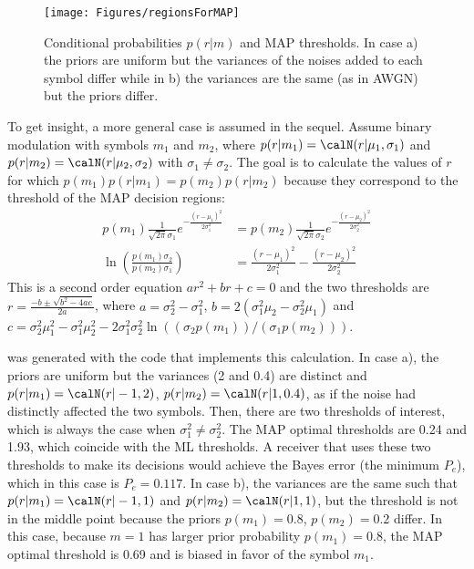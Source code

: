 \begin{figure}[htbp]
\centering
\texttt{[image: Figures/regionsForMAP]}
\caption{Conditional probabilities $p(r|m)$ and MAP thresholds. In case a) the priors are uniform but the variances of the noises added to each symbol differ while in b) the variances are the same (as in AWGN) but the priors differ.\label{fig:regionsForMAP}}
\end{figure}

To get insight, a more general case is assumed in the sequel. Assume binary modulation with symbols $m_1$ and $m_2$, where $p(r|m_1)=\calN(r|\mu_1,\sigma_1)$ and $p(r|m_2)=\calN(r|\mu_2,\sigma_2)$ with $\sigma_1 \ne \sigma_2$. The goal is to calculate the values of $r$ for which $p(m_1)p(r|m_1)=p(m_2)p(r|m_2)$ because they correspond to the threshold of the MAP decision regions:
\begin{align*}
p(m_1) \frac{1}{\sqrt{2 \pi} \sigma_1} e^{- \frac{(r-\mu_1)^2}{2 \sigma_1^2} } &= p(m_2) \frac{1}{\sqrt{2 \pi} \sigma_2} e^{- \frac{(r-\mu_2)^2}{2 \sigma_2^2} } \\
\ln \left( \frac{p(m_1) \sigma_2}{p(m_2) \sigma_1} \right)&=\frac{(r-\mu_1)^2}{2 \sigma_1^2}  -\frac{(r-\mu_2)^2}{2 \sigma_2^2}
\end{align*}
This is a second order equation $a r^2 + b r + c = 0$ and the two thresholds are 
$r = \frac{-b \pm \sqrt{b^2-4ac}}{2a}$, where
$a=\sigma_2^2 - \sigma_1^2$, $b=2(\sigma_1^2 \mu_2 - \sigma_2^2 \mu_1)$ and $c=\sigma_2^2 \mu_1^2 - \sigma_1^2 \mu_2^2 - 2 \sigma_1^2 \sigma_2^2 \ln((\sigma_2 p(m_1))/(\sigma_1 p(m_2)))$.

 was generated with the code  that implements this calculation. In case a), the priors are uniform but the variances (2 and 0.4) are distinct and $p(r|m_1)=\calN(r|-1,2)$, $p(r|m_2)=\calN(r|1,0.4)$, as if the noise had distinctly affected the two symbols. Then, there are two thresholds of interest, which is always the case when $\sigma^2_1 \ne \sigma^2_2$. The MAP optimal thresholds are 0.24 and 1.93, which coincide with the ML thresholds. A receiver that uses these two thresholds to make its decisions would achieve the Bayes error (the minimum $P_e$), which in this case is $P_e=0.117$.
In case b), the variances are the same such that $p(r|m_1)=\calN(r|-1,1)$ and $p(r|m_2)=\calN(r|1,1)$, but the threshold is not in the middle point because the priors $p(m_1)=0.8$, $p(m_2)=0.2$ differ. In this case, because $m=1$ has larger prior probability $p(m_1)=0.8$, the MAP optimal threshold is 0.69 and is biased in favor of the symbol $m_1$.

